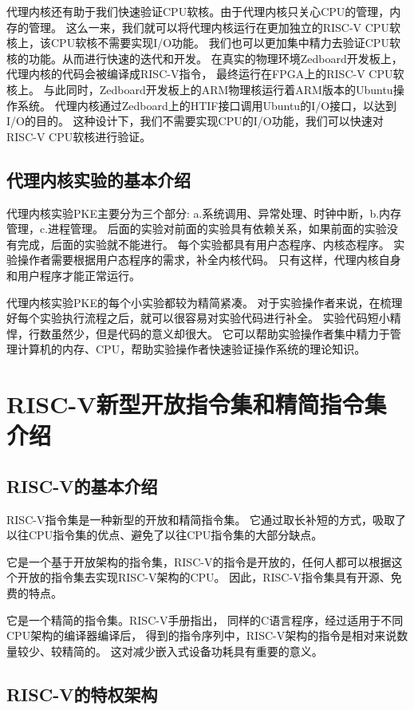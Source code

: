 代理内核还有助于我们快速验证CPU软核。由于代理内核只关心CPU的管理，内存的管理。
这么一来，我们就可以将代理内核运行在更加独立的RISC-V CPU软核上，该CPU软核不需要实现I/O功能。
我们也可以更加集中精力去验证CPU软核的功能。从而进行快速的迭代和开发。
在真实的物理环境Zedboard开发板上，
代理内核的代码会被编译成RISC-V指令，
最终运行在FPGA上的RISC-V CPU软核上。
与此同时，Zedboard开发板上的ARM物理核运行着ARM版本的Ubuntu操作系统。
代理内核通过Zedboard上的HTIF接口调用Ubuntu的I/O接口，以达到I/O的目的。
这种设计下，我们不需要实现CPU的I/O功能，我们可以快速对RISC-V CPU软核进行验证。

\subsection{代理内核实验的基本介绍}

代理内核实验PKE主要分为三个部分:
a.系统调用、异常处理、时钟中断，b.内存管理，c.进程管理。
后面的实验对前面的实验具有依赖关系，如果前面的实验没有完成，后面的实验就不能进行。
每个实验都具有用户态程序、内核态程序。
实验操作者需要根据用户态程序的需求，补全内核代码。
只有这样，代理内核自身和用户程序才能正常运行。

代理内核实验PKE的每个小实验都较为精简紧凑。
对于实验操作者来说，在梳理好每个实验执行流程之后，就可以很容易对实验代码进行补全。
实验代码短小精悍，行数虽然少，但是代码的意义却很大。
它可以帮助实验操作者集中精力于管理计算机的内存、CPU，帮助实验操作者快速验证操作系统的理论知识。


\section{RISC-V新型开放指令集和精简指令集介绍}

\subsection{RISC-V的基本介绍}

RISC-V指令集是一种新型的开放和精简指令集。
它通过取长补短的方式，吸取了以往CPU指令集的优点、避免了以往CPU指令集的大部分缺点。

它是一个基于开放架构的指令集，RISC-V的指令是开放的，任何人都可以根据这个开放的指令集去实现RISC-V架构的CPU。
因此，RISC-V指令集具有开源、免费的特点。

它是一个精简的指令集。RISC-V手册指出，
同样的C语言程序，经过适用于不同CPU架构的编译器编译后，
得到的指令序列中，RISC-V架构的指令是相对来说数量较少、较精简的。
这对减少嵌入式设备功耗具有重要的意义。

\subsection{RISC-V的特权架构}

